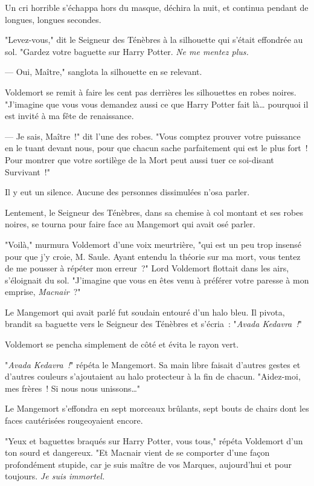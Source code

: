 Un cri horrible s'échappa hors du masque, déchira la nuit, et continua pendant de longues, longues secondes.

"Levez-vous," dit le Seigneur des Ténèbres à la silhouette qui s'était effondrée au sol. "Gardez votre baguette sur Harry Potter. \emph{Ne me mentez plus.}

--- Oui, Maître," sanglota la silhouette en se relevant.

Voldemort se remit à faire les cent pas derrières les silhouettes en robes noires. "J'imagine que vous vous demandez aussi ce que Harry Potter fait là… pourquoi il est invité à ma fête de renaissance.

--- Je sais, Maître~!" dit l'une des robes. "Vous comptez prouver votre puissance en le tuant devant nous, pour que chacun sache parfaitement qui est le plus fort~! Pour montrer que votre sortilège de la Mort peut aussi tuer ce soi-disant Survivant~!"

Il y eut un silence. Aucune des personnes dissimulées n'osa parler.

Lentement, le Seigneur des Ténèbres, dans sa chemise à col montant et ses robes noires, se tourna pour faire face au Mangemort qui avait osé parler.

"Voilà," murmura Voldemort d'une voix meurtrière, "qui est un peu trop insensé pour que j'y croie, M. Saule. Ayant entendu la théorie sur ma mort, vous tentez de me pousser à répéter mon erreur~?" Lord Voldemort flottait dans les airs, s'éloignait du sol. "J'imagine que vous en êtes venu à préférer votre paresse à mon emprise, \emph{Macnair}~?"

Le Mangemort qui avait parlé fut soudain entouré d'un halo bleu. Il pivota, brandit sa baguette vers le Seigneur des Ténèbres et s'écria~: "\emph{Avada Kedavra~!}"

Voldemort se pencha simplement de côté et évita le rayon vert.

"\emph{Avada Kedavra~!}" répéta le Mangemort. Sa main libre faisait d'autres gestes et d'autres couleurs s'ajoutaient au halo protecteur à la fin de chacun. "Aidez-moi, mes frères~! Si nous nous unissons…"

Le Mangemort s'effondra en sept morceaux brûlants, sept bouts de chairs dont les faces cautérisées rougeoyaient encore.

"Yeux et baguettes braqués sur Harry Potter, vous tous," répéta Voldemort d'un ton sourd et dangereux. "Et Macnair vient de se comporter d'une façon profondément stupide, car je suis maître de vos Marques, aujourd'hui et pour toujours. \emph{Je suis immortel.}

